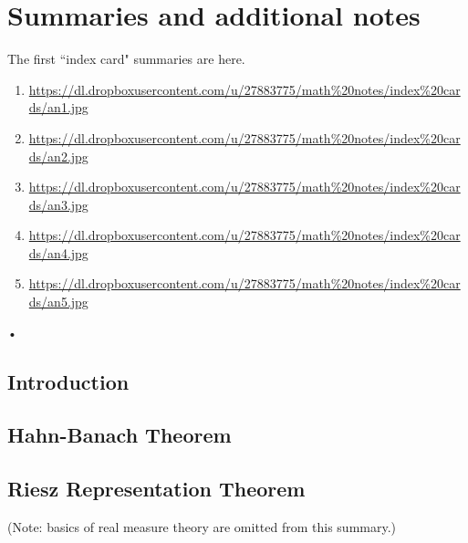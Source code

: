 \chapter{Summaries and additional notes}

The first ``index card" summaries are here.
\begin{enumerate}
\item
\url{https://dl.dropboxusercontent.com/u/27883775/math\%20notes/index\%20cards/an1.jpg}
\item
\url{https://dl.dropboxusercontent.com/u/27883775/math\%20notes/index\%20cards/an2.jpg}
\item
\url{https://dl.dropboxusercontent.com/u/27883775/math\%20notes/index\%20cards/an3.jpg}
\item
\url{https://dl.dropboxusercontent.com/u/27883775/math\%20notes/index\%20cards/an4.jpg}
\item
\url{https://dl.dropboxusercontent.com/u/27883775/math\%20notes/index\%20cards/an5.jpg}
\end{enumerate}•
\section{Introduction}

\section{Hahn-Banach Theorem}

\section{Riesz Representation Theorem}

(Note: basics of real measure theory are omitted from this summary.)

